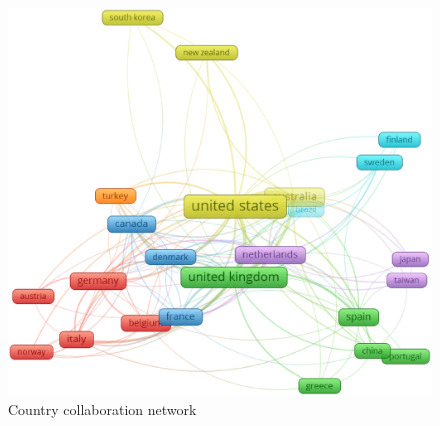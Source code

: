 \documentclass[11pt,a4paper]{elsarticle} %
\begin{document}
\begin{figure}[htbp]
\centering
\includegraphics[scale=0.4]{fig.7.eps}
\caption{Country collaboration network}
\end{figure}
\end{document}
